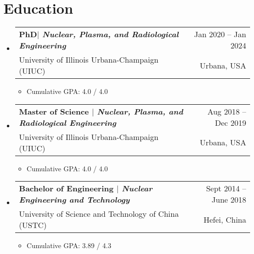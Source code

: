 \documentclass[letterpaper,11pt]{article} %
\makeatletter
\newcommand{\CVItem}[1]{
  \item\small{
    {#1 \vspace{-2pt}}
  }
}
\newcommand{\CVSubheading}[4]{
  \vspace{-2pt}\item
    \begin{tabular*}{0.97\textwidth}[t]{l@{\extracolsep{\fill}}r}
      \textbf{#1} & #2 \\
      \small#3 & \small #4 \\
    \end{tabular*}\vspace{-7pt}
}
\newcommand{\CVSubHeadingListStart}{\begin{itemize}[leftmargin=0.5cm, label={}]}
\newcommand{\CVSubHeadingListEnd}{\end{itemize}}
\newcommand{\CVItemListStart}{\begin{itemize}}
\newcommand{\CVItemListEnd}{\end{itemize}\vspace{-5pt}}
\makeatother
\begin{document}
\section{Education}
  \CVSubHeadingListStart
    \CVSubheading
      {{PhD$|$ \emph{\small{Nuclear, Plasma, and Radiological Engineering}}}}{Jan 2020 -- Jan 2024}
      {University of Illinois Urbana-Champaign (UIUC)}{Urbana, USA}
      \CVItemListStart
        \CVItem{Cumulative GPA:  4.0 / 4.0}
      \CVItemListEnd
    \CVSubheading
      {{Master of Science $|$ \emph{\small{Nuclear, Plasma, and Radiological Engineering}}}}{Aug 2018 -- Dec 2019}
      {University of Illinois Urbana-Champaign (UIUC)}{Urbana, USA}
       \CVItemListStart
        \CVItem{Cumulative GPA:  4.0 / 4.0}
      \CVItemListEnd
    \CVSubheading
      {{Bachelor of Engineering $|$ \emph{\small{Nuclear Engineering and Technology}}}}{Sept 2014 -- June 2018}
      {University of Science and Technology of China (USTC)}{Hefei, China}
       \CVItemListStart
        \CVItem{Cumulative GPA:  3.89 / 4.3}
      \CVItemListEnd
  \CVSubHeadingListEnd

\begin{comment}
try to briefly explain what you did and why it is relevant to the position you
are seeking
\end{comment}
\begin{comment}
Ideally the title of the work should speak for what it is. However if you feel
like you should explain more about why the project is applicable to this job,
use item list as is shown in the work experience section.
\end{comment}
\end{document}
